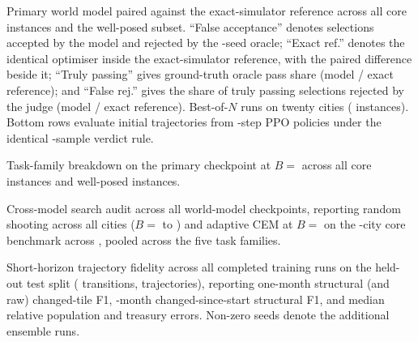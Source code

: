 \begin{table}[tbp]
\caption{Primary \SizeM{} world model paired against the exact-simulator reference across all \MainInstances{} core instances and the \WellPosed{} well-posed subset. ``False acceptance'' denotes selections accepted by the model and rejected by the \OracleSeeds-seed oracle; ``Exact ref.'' denotes the identical optimiser inside the exact-simulator reference, with the paired difference beside it; ``Truly passing'' gives ground-truth oracle pass share (model / exact reference); and ``False rej.'' gives the share of truly passing selections rejected by the judge (model / exact reference). Best-of-$N$ runs on twenty cities (\BonInstances{} instances). Bottom rows evaluate initial trajectories from \RlMonths{}-step PPO policies under the identical \KVerdict-sample verdict rule.}
\label{tab:main}
\centering\scriptsize\setlength{\tabcolsep}{3.5pt}

\end{table}

\begin{table}[tbp]
\caption{Task-family breakdown on the primary \SizeM{} checkpoint at $B ={}$ across all core instances and well-posed instances.}
\label{tab:family}
\centering\scriptsize\setlength{\tabcolsep}{3.5pt}

\end{table}

\ifAcrossDone
\begin{table}[tbp]
\caption{Cross-model search audit across all \Ladder{} world-model checkpoints, reporting random shooting across all \AllCities{} cities ($B ={}$ to ) and adaptive CEM at $B ={}$ on the \HeldOutFamilies-city core benchmark\ifAcAdSet{} across \AcAdSetName{}\fi, pooled across the five task families.}
\label{tab:curves}
\centering\scriptsize\setlength{\tabcolsep}{3.5pt}

\end{table}
\fi

\begin{table}[tbp]
\caption{Short-horizon trajectory fidelity across all \TestRuns{} completed training runs on the held-out test split (\TestTransitions{} transitions, \TestPlans{} trajectories), reporting one-month structural (and raw) changed-tile F1, \RollA-month changed-since-start structural F1, and median relative population and treasury errors. Non-zero seeds denote the additional \SizeM{} ensemble runs. \HorizonTableNote{}}
\label{tab:test}
\centering\scriptsize\setlength{\tabcolsep}{4pt}

\end{table}

